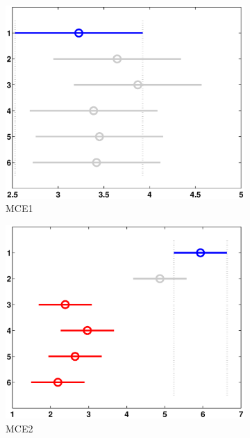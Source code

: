 \begin{figure}
	\centering
     \captionsetup{width=.85\linewidth}
	\begin{subfigure}[b]{0.49\linewidth}
		\includegraphics[width=\linewidth]{Figures/B-Bonferroni_HNMED_VS_ED1}
		\caption{MCE1} \label{fig:Bon_M1} 
	\end{subfigure}
	\begin{subfigure}[b]{0.49\linewidth}
		\includegraphics[width=\textwidth]{Figures/B-Bonferroni_HNMED_VS_ED2}
		\caption{MCE2} \label{fig:Bon_M2} 
	\end{subfigure}
	\begin{subfigure}[b]{0.49\linewidth}

\end{subfigure}
\end{figure}
